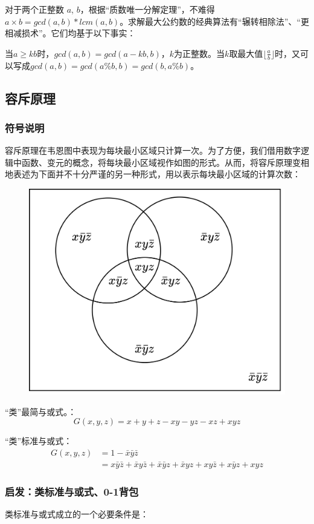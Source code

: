 \documentclass[12pt]{ctexart}
\begin{document}
对于两个正整数 $a$, $b$，根据“质数唯一分解定理”，不难得$a \times b = gcd(a, b) * lcm(a, b)$。求解最大公约数的经典算法有“辗转相除法”、“更相减损术”。它们均基于以下事实：

当$a\ge kb$时，$gcd(a, b) = gcd(a-kb, b)$，$k$为正整数。当$k$取最大值$\lfloor \frac{a}{b} \rfloor$时，又可以写成$gcd(a, b) = gcd(a\%b, b) = gcd(b, a \% b)$。

\newpage
\subsection{容斥原理}
\subsubsection{符号说明}
容斥原理在韦恩图中表现为每块最小区域只计算一次。为了方便，我们借用数字逻辑中函数、变元的概念，将每块最小区域视作如图的形式。从而，将容斥原理变相地表述为下面并不十分严谨的另一种形式，用以表示每块最小区域的计算次数：

\begin{figure}[htbp]
    \centering
    \includegraphics[width=0.55\linewidth]{assets/4-p.png}
\end{figure}



“类”最简与或式。：
$$G(x, y, z) = x + y + z - xy - yz - xz + xyz$$

“类”标准与或式：
$$
\begin{aligned}
    G(x, y, z) &= 1 - \bar{x}\bar{y}\bar{z} \\ 
    &= x\bar{y}\bar{z} + \bar{x}y\bar{z} + \bar{x}\bar{y}z + \bar{x}yz + xy\bar{z}  + x\bar{y}z + xyz
\end{aligned}
$$

\newpage
\subsubsection{启发：类标准与或式、0-1背包}
类标准与或式成立的一个必要条件是：
\end{document}
